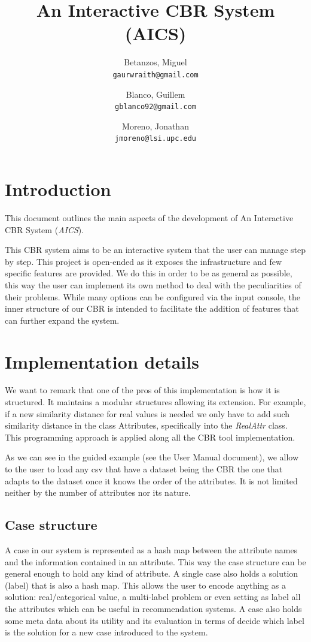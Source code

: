 \documentclass[11pt]{article}
\title{An Interactive CBR System (AICS)}
\author{
  Betanzos, Miguel\\
  \texttt{gaurwraith@gmail.com}
  \and
  Blanco, Guillem\\
  \texttt{gblanco92@gmail.com}
  \and
  Moreno, Jonathan\\
  \texttt{jmoreno@lsi.upc.edu}
}
\date{}
\begin{document}
\maketitle


\section{Introduction}

This document outlines the main aspects of the development of An Interactive CBR System (\emph{AICS}).

This CBR system aims to be an interactive system that the user can manage step by step. This project is open-ended as it exposes the infrastructure and few specific features are provided. We do this in order to be as general as possible, this way the user can implement its own method to deal with the peculiarities of their problems. While many options can be configured via the input console, the inner structure of our CBR is intended to facilitate the addition of features that can further expand the system.

\section{Implementation details}

We want to remark that one of the pros of this implementation is how it is structured. It maintains a modular structures allowing its extension. For example, if a new similarity distance for real values is needed we only have to add such similarity distance in the class Attributes, specifically into the \emph{RealAttr} class. This programming approach is applied along all the CBR tool implementation.

As we can see in the guided example (see the User Manual document), we allow to the user to load any csv that have a dataset being the CBR the one that adapts to the dataset once it knows the order of the attributes. It is not limited neither by the number of attributes nor its nature.

\subsection{Case structure}

A case in our system is represented as a hash map between the attribute names and the information contained in an attribute. This way the case structure can be general enough to hold any kind of attribute. A single case also holds a solution (label) that is also a hash map. This allows the user to encode anything as a solution: real/categorical value, a multi-label problem or even setting as label all the attributes which can be useful in recommendation systems. A case also holds some meta data about its utility and its evaluation in terms of decide which label is the solution for a new case introduced to the system.
\end{document}
